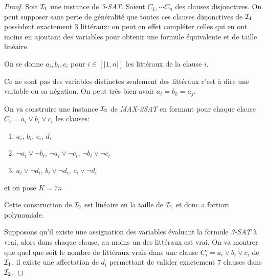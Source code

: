 \documentclass{standalone}
\begin{document}
\begin{proof}
	Soit $\mathcal I_1$ une instance de \textit{3-SAT}. Soient $C_1, \cdots C_n$ des clauses disjonctives. On peut supposer sans perte de généralité que toutes ces clauses disjonctives de $\mathcal I_1$ possèdent exactement 3 littéraux: on peut en effet compléter celles qui en ont moins en ajoutant des variables pour obtenir une formule équivalente et de taille linéaire.
	
	On se donne $a_i, b_i, c_i$ pour $i \in [|1, n|]$ les littéraux de la clause $i$. 
	
	\begin{rem}
		Ce ne sont pas des variables distinctes seulement des littéraux c'est à dire une variable ou sa négation. On peut très bien avoir $a_i = b_k = a_j$.
	\end{rem}

	On va construire une instance $\mathcal I_2$ de \textit{MAX-2SAT} en formant pour chaque clause $C_i = a_i \lor b_i \lor c_i$ les clauses:
	\begin{enumerate}
		\item $a_i$, $b_i$, $c_i$, $d_i$
		\item $\neg a_i \lor \neg b_i$, $\neg a_i \lor \neg c_i$, $\neg b_i \lor \neg c_i$
		\item $a_i \lor \neg d_i$, $b_i \lor \neg d_i$, $c_i \lor \neg d_i$
	\end{enumerate}

	et on pose $K = 7n$
	
	Cette construction de $\mathcal I_2$ est linéaire en la taille de $\mathcal I_1$ et donc a fortiori polynomiale.
	
	Supposons qu'il existe une assignation des variables évaluant la formule \textit{3-SAT} à vrai, alors dans chaque clause, au moins un des littéraux est vrai. On va montrer que quel que soit le nombre de littéraux vrais dans une clause $C_i = a_i \lor b_i \lor c_i$ de $\mathcal I_1$, il existe une affectation de $d_i$ permettant de valider exactement $7$ clauses dans $\mathcal I_2$.
	

\end{proof}
\end{document}
